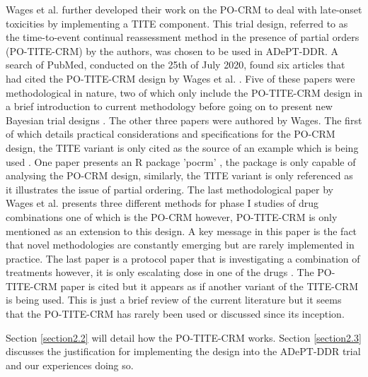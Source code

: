 Wages et al. \cite{wagesContinualReassessmentMethod2011, wagesUsingTimetoeventContinual2013} further developed their work on the PO-CRM to deal with late-onset toxicities by implementing a TITE component. This trial design, referred to as the time-to-event continual reassessment method in the presence of partial orders (PO-TITE-CRM) by the authors, was chosen to be used in ADePT-DDR. A search of PubMed, conducted on the 25th of July 2020, found six articles that had cited the PO-TITE-CRM design by Wages et al. \cite{wagesUsingTimetoeventContinual2013}. Five of these papers were methodological in nature, two of which only include the PO-TITE-CRM design in a brief introduction to current methodology before going on to present new Bayesian trial designs \cite{liuBAYESIANDATAAUGMENTATION2013, wheelerBayesianModelfreeApproach2019}. The other three papers were authored by Wages. The first of which details practical considerations and specifications for the PO-CRM design, the TITE variant is only cited as the source of an example which is being used \cite{wagesSpecificationsContinualReassessment2013}. One paper presents an R package 'pocrm' \cite{wagesPocrmRpackagePhase2013, wagesPocrmDoseFinding2019}, the package is only capable of analysing the PO-CRM design, similarly, the TITE variant is only referenced as it illustrates the issue of partial ordering. The last methodological paper by Wages et al. \cite{wagesPracticalDesignsPhase2016} presents three different methods for phase \RN{1} studies of drug combinations one of which is the PO-CRM however, PO-TITE-CRM is only mentioned as an extension to this design. A key message in this paper is the fact that novel methodologies are constantly emerging but are rarely implemented in practice. The last paper is a protocol paper that is investigating a combination of treatments however, it is only escalating dose in one of the drugs \cite{lesueurPhaseIIaStudy2019}. The PO-TITE-CRM paper is cited but it appears as if another variant of the TITE-CRM is being used. This is just a brief review of the current literature but it seems that the PO-TITE-CRM has rarely been used or discussed since its inception. 

Section \ref{section2.2} will detail how the PO-TITE-CRM works. Section \ref{section2.3} discusses the justification for implementing the design into the ADePT-DDR trial and our experiences doing so.  

